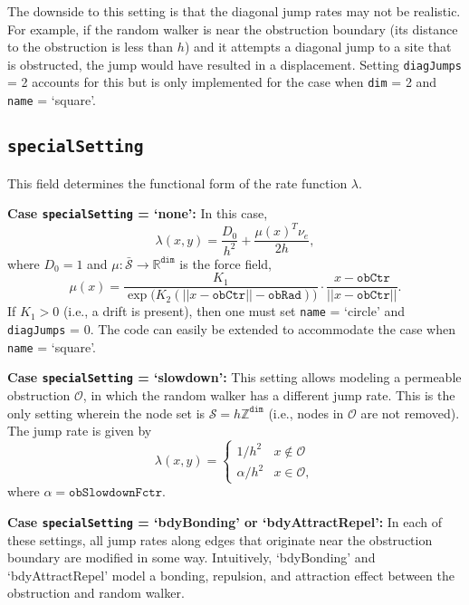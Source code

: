 \documentclass[11pt, oneside]{article}   	%
\theoremstyle{definition}
\newcommand{\real}{{\mathbb R}}
\newcommand\sS{\mathcal{S}}
\newcommand{\integ}{{\mathbb Z}}
\newcommand\oS{\bar{\sS}}
\begin{document}
The downside to this setting is that the diagonal jump rates may not be realistic. For example, if the random walker is near the obstruction boundary (its distance to the obstruction is less than $h$) and it attempts a diagonal jump to a site that is obstructed, the jump would have resulted in a displacement. Setting \texttt{diagJumps} = 2 accounts for this but is only implemented for the case when \texttt{dim} = 2 and \texttt{name} = `square'.

\subsection{\texttt{specialSetting}}
This field determines the functional form of the rate function $\lambda$.

{\bf Case \texttt{specialSetting} = `none':}
In this case,
\begin{equation}\label{eqn:rate-normal}
	\lambda(x,y) = \frac{D_0}{h^2} + \frac{\mu(x)^T \nu_e}{2h},
\end{equation}
where $D_0 = 1$ and $\mu: \oS \rightarrow \real^{\texttt{dim}}$ is the force field,
\begin{equation}\label{eqn:drift}
\mu(x) = \frac{K_1}{\exp\big(K_2(||x - \texttt{obCtr}|| - \texttt{obRad})\big)} \cdot \frac{x - \texttt{obCtr}}{||x - \texttt{obCtr}||}.
\end{equation}
If $K_1 > 0$ (i.e., a drift is present), then one must set \texttt{name} = `circle' and \texttt{diagJumps} = 0. The code can easily be extended to accommodate the case when \texttt{name} = `square'.

{\bf Case \texttt{specialSetting} = `slowdown':}
This setting allows modeling a permeable obstruction $\mathcal{O}$, in which the random walker has a different jump rate. This is the only setting wherein the node set is $\sS = h \integ^{\texttt{dim}}$ (i.e., nodes in $\mathcal{O}$ are not removed). The jump rate is given by
\begin{equation}\label{eqn:rate-slowdown}
\lambda(x,y) = 
	\begin{cases}
		1/h^2 & x \notin \mathcal{O} \\
		\alpha/h^2 & x \in \mathcal{O},
	\end{cases}
\end{equation}
where $\alpha = \texttt{obSlowdownFctr}$.

{\bf Case \texttt{specialSetting} = `bdyBonding' or `bdyAttractRepel':} In each of these settings, all jump rates along edges that originate near the obstruction boundary are modified in some way. Intuitively, `bdyBonding' and `bdyAttractRepel' model a bonding, repulsion, and attraction effect between the obstruction and random walker.
\end{document}
